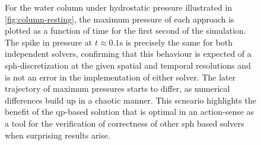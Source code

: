 \documentclass[conference]{IEEEtran}
\begin{document}
\begin{figure}
  \centering
  \caption{For the water column under hydrostatic pressure illustrated in \autoref{fig:column-resting}, the maximum pressure of each approach is plotted as a function of time for the first second of the simulation. The spike in pressure at $t\approx 0.1\text{s}$ is precisely the same for both independent solvers, confirming that this behaviour is expected of a \ac{sph}-discretization at the given spatial and temporal resolutions and is not an error in the implementation of either solver. The later trajectory of maximum pressures starts to differ, as numerical differences build up in a chaotic manner. This scneario highlights the benefit of the \ac{qp}-based solution that is optimal in an action-sense as a tool for the verification of correctness of other \ac{sph} based solvers when surprising results arise.} 
  \label{fig:pressure-graph}
\end{figure}
\end{document}

